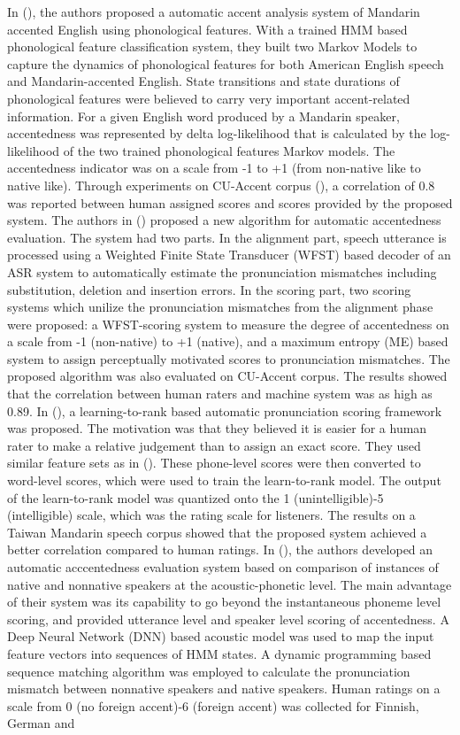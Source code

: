 In (\cite{sangwan2012automatic}), the authors proposed a automatic accent analysis system of Mandarin accented English using phonological features. With a trained HMM based phonological feature classification system, they built two Markov Models to capture the dynamics of phonological features for both American English speech and Mandarin-accented English. State transitions and state durations of phonological features were believed to carry very important accent-related information. For a given English word produced by a Mandarin speaker, accentedness was represented by delta log-likelihood that is calculated by the log-likelihood of the two trained phonological features Markov models. The accentedness indicator was on a scale from -1 to +1 (from non-native like to native like). Through experiments on CU-Accent corpus (\cite{angkititrakul2006advances}), a correlation of 0.8 was reported between human assigned scores and scores provided by the proposed system. The authors in (\cite{william2013automatic}) proposed a new algorithm for automatic accentedness evaluation. The system had two parts. In the alignment part, speech utterance is processed using a Weighted Finite State Transducer (WFST) based decoder of an ASR system to automatically estimate the pronunciation mismatches including substitution, deletion and insertion errors. In the scoring part, two scoring systems which unilize the pronunciation mismatches from the alignment phase were proposed: a WFST-scoring system to measure the degree of accentedness on a scale from -1 (non-native) to +1 (native), and a maximum entropy (ME) based system to assign perceptually motivated scores to pronunciation mismatches. The proposed algorithm was also evaluated on CU-Accent corpus. The results showed that the correlation between human raters and machine system was as high as 0.89. In (\cite{chen2015automatic}), a learning-to-rank based automatic pronunciation scoring framework was proposed. The motivation was that they believed it is easier for a human rater to make a relative judgement than to assign an exact score. They used similar feature sets as in (\cite{kim1997automatic}). These phone-level scores were then converted to word-level scores, which were used to train the learn-to-rank model. The output of the learn-to-rank model was quantized onto the 1 (unintelligible)-5 (intelligible) scale, which was the rating scale for listeners. The results on a Taiwan Mandarin speech corpus showed that the proposed system achieved a better correlation compared to human ratings. In (\cite{rasipuram2015automatic}), the authors developed an automatic acccentedness evaluation system based on comparison of instances of native and nonnative speakers at the acoustic-phonetic level. The main advantage of their system was its capability to go beyond the instantaneous phoneme level scoring, and provided utterance level and speaker level scoring of accentedness. A Deep Neural Network (DNN) based acoustic model was used to map the input feature vectors into sequences of HMM states. A dynamic programming based sequence matching algorithm was employed to calculate the pronunciation mismatch between nonnative speakers and native speakers. Human ratings on a scale from 0 (no foreign accent)-6 (foreign accent) was collected for Finnish, German and 